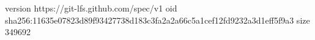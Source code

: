 version https://git-lfs.github.com/spec/v1
oid sha256:11635e07823d89f93427738d183c3fa2a2a66c5a1cef12fd9232a3d1eff5f9a3
size 349692
